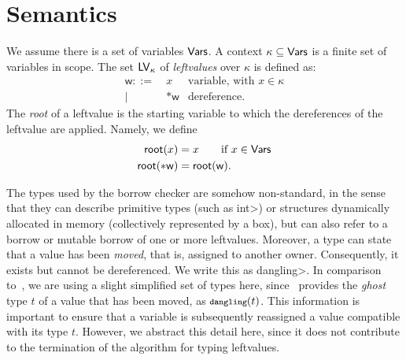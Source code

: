 \section{Semantics}\label{sec:semantics}

\begin{definition}
  We assume there is a set of variables $\mathsf{Vars}$.
  A context $\kappa\subseteq\mathsf{Vars}$ is a finite set of variables in scope.
  The set $\mathsf{LV}_\kappa$ of \emph{leftvalues} over $\kappa$ is defined as:
  \begin{align*}
    \mathsf{w} ::= &\ x & \text{variable, with $x\in\kappa$}\\
    | &\ \mathtt{*}\mathsf{w} & \text{dereference.}
  \end{align*}
  The \emph{root} of a leftvalue is the starting variable to which the dereferences of the
  leftvalue are applied. Namely, we define
  \begin{align*}
    \mathsf{root}(x) &= x\qquad\text{if $x\in\mathsf{Vars}$}\\
    \mathsf{root}(\mathtt{*}\mathsf{w}) &= \mathsf{root}(\mathsf{w}).
  \end{align*}
\end{definition}

The types used by the borrow checker are somehow non-standard, in the sense
that they can describe primitive types (such as \<int>) or structures
dynamically allocated in memory (collectively represented by a box), but can also refer to
a borrow or mutable borrow of one or more leftvalues.
Moreover, a type can state that a value has been \emph{moved}, that is, assigned
to another owner. Consequently, it exists but cannot be dereferenced.
We write this as \<dangling>. In comparison to~\cite{Pearce21}, we are using
a slight simplified set of types here, since~\cite{Pearce21} provides
the \emph{ghost} type $t$ of a value that has been moved, as $\<dangling>(t)$.
This information is important to ensure that a variable is subsequently
reassigned a value compatible
with its type $t$. However, we abstract this detail here, since it does not contribute to
the termination of the algorithm for typing leftvalues.

